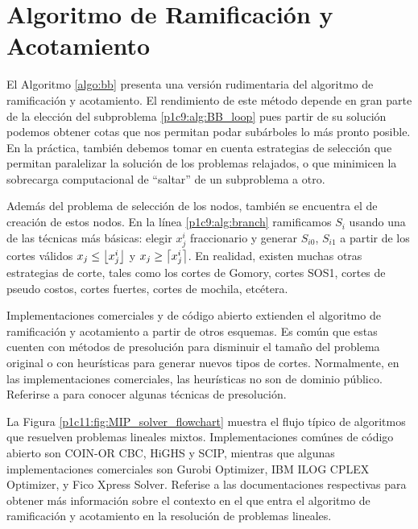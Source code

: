 \appendix

\chapter{Algoritmo de Ramificación y Acotamiento}
\label{app:bb}

\noindent
El Algoritmo \ref{algo:bb} presenta una versión rudimentaria del algoritmo de ramificación y
acotamiento. El rendimiento de este método depende en gran parte de la elección del subproblema
\eqref{p1c9:alg:BB_loop} pues partir de su solución podemos obtener cotas que nos permitan podar
subárboles lo más pronto posible. En la práctica, también debemos tomar en cuenta estrategias de
selección que permitan paralelizar la solución de los problemas relajados, o que minimicen la
sobrecarga computacional de ``saltar'' de un subproblema a otro.

Además del problema de selección de los nodos, también se encuentra el de creación de estos nodos.
En la línea \eqref{p1c9:alg:branch} ramificamos $S_i$ usando una de las técnicas más básicas: elegir
$x_j^i$ fraccionario y generar $S_{i0}$, $S_{i1}$ a partir de los cortes válidos $x_j \leq
\left\lfloor x_j^i \right\rfloor$ y $x_j \geq \left\lceil x_j^i \right\rceil$. En realidad, existen muchas otras estrategias de corte,
tales como los cortes de Gomory, cortes SOS1, cortes de pseudo costos, cortes fuertes, cortes de
mochila, etcétera.

Implementaciones comerciales y de código abierto extienden el algoritmo de ramificación y
acotamiento a partir de otros esquemas. Es común que estas cuenten con métodos de presolución para
disminuir el tamaño del problema original o con heurísticas para generar nuevos tipos de cortes.
Normalmente, en las implementaciones comerciales, las heurísticas no son de dominio público.
Referirse a \cite{andersen} para conocer algunas técnicas de presolución.

La Figura \ref{p1c11:fig:MIP_solver_flowchart} muestra el flujo típico de algoritmos que resuelven
problemas lineales mixtos. Implementaciones comúnes de código abierto son
COIN-OR CBC, HiGHS y SCIP, mientras que algunas implementaciones comerciales son Gurobi Optimizer,
IBM ILOG CPLEX Optimizer, y Fico Xpress Solver. Referise a las documentaciones respectivas para
obtener más información sobre el contexto en el que entra el algoritmo de ramificación y acotamiento
en la resolución de problemas lineales.

